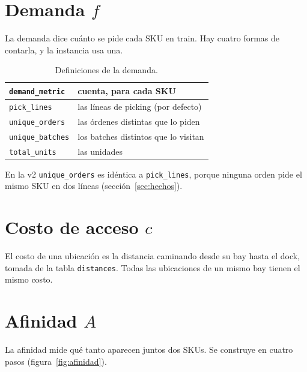 \documentclass[11pt,a4paper,oneside]{report}
\newcommand{\code}[1]{\texttt{\small #1}}
\begin{document}
\section{Demanda $f$}

La demanda dice cuánto se pide cada SKU en train. Hay cuatro formas de contarla, y la
instancia usa una.

\begin{table}[ht]
\centering\small
\begin{tabular}{@{}ll@{}}
\toprule
\code{demand\_metric} & cuenta, para cada SKU \\
\midrule
\code{pick\_lines} & las líneas de picking (por defecto) \\
\code{unique\_orders} & las órdenes distintas que lo piden \\
\code{unique\_batches} & los batches distintos que lo visitan \\
\code{total\_units} & las unidades \\
\bottomrule
\end{tabular}
\caption{Definiciones de la demanda.}
\end{table}

En la v2 \code{unique\_orders} es idéntica a \code{pick\_lines}, porque ninguna orden pide el
mismo SKU en dos líneas (sección~\ref{sec:hechos}).

\section{Costo de acceso $c$}

El costo de una ubicación es la distancia caminando desde su bay hasta el dock, tomada de la
tabla \code{distances}. Todas las ubicaciones de un mismo bay tienen el mismo costo.

\section{Afinidad $A$}
\label{sec:afinidad}

La afinidad mide qué tanto aparecen juntos dos SKUs. Se construye en cuatro pasos
(figura~\ref{fig:afinidad}).
\end{document}
